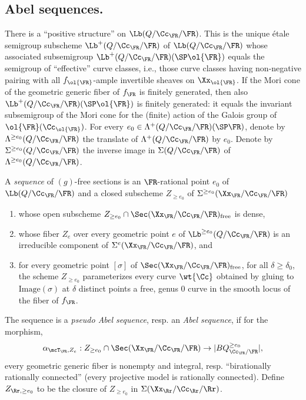 \subsection{Abel sequences.} \label{subsec-Abelseq}
There is a ``positive structure'' on $\Lb(Q/\Cc_\FR/\FR)$. This is the unique étale semigroup subscheme $\Lb^+(Q/\Cc_\FR/\FR)$ of $\Lb(Q/\Cc_\FR/\FR)$ whose associated subsemigroup $\Lb^+(Q/\Cc_\FR/\FR)(\SP \ol{\FR})$ equals the semigroup of ``effective'' curve classes, i.e., those curve classes having non-negative pairing with all $f_{\ol{\FR}}$-ample invertible sheaves on $\Xx_{\ol{\FR}}$. If the Mori cone of the geometric generic fiber of $f_\FR$ is finitely generated, then also $\Lb^+(Q/\Cc_\FR/\FR)(\SP \ol{\FR})$ is finitely generated: it equals the invariant subsemigroup of the Mori cone for the (finite) action of the Galois group of $\ol{\FR}(\Cc_{\ol{\FR}})$. For every $e_0\in
\Lambda^+(Q/\Cc_\FR/\FR)(\SP \FR)$, denote by $\Lambda^{\geq e_0}(Q/\Cc_\FR/\FR)$ the translate of $\Lambda^+(Q/\Cc_\FR/\FR)$ by $e_0$. Denote by $\Sigma^{\geq e_0}(Q/\Cc_\FR/\FR)$ the inverse image in $\Sigma(Q/\Cc_\FR/\FR)$ of $\Lambda^{\geq e_0}(Q/\Cc_\FR/\FR)$.


\goodbreak
\begin{defi}\label{defn-seq}
A \emph{sequence} of $(g)$-free sections is an $\FR$-rational point $e_0$ of $\Lb(Q/\Cc_\FR/\FR)$ and a closed subscheme $Z_{\geq e_0}$ of $\Sigma^{\geq e_0}(\Xx_\FR/\Cc_\FR/\FR)$
\begin{enumerate}\romanenumi
\item \label{list2.5.1}whose open subscheme $Z_{\geq e_0}
\cap \Sec(\Xx_\FR/\Cc_\FR/\FR)_{\text{free}}$ is dense,
\item \label{list2.5.2}whose fiber $Z_e$ over every geometric point $e$ of $\Lb^{\geq e_0}(Q/\Cc_\FR/\FR)$ is an irreducible component of $\Sigma^e(\Xx_\FR/\Cc_\FR/\FR)$, and
\item \label{list2.5.3}for every geometric point $[\sigma]$ of $\Sec(\Xx_\FR/\Cc_\FR/\FR)_{\text{free}}$, for all $\delta \geq \delta_0$, the scheme $Z_{\geq e_0}$ parameterizes every curve $\wt{\Cc}$ obtained by gluing to $\text{Image}(\sigma)$ at $\delta$ distinct points a free, genus $0$ curve in the smooth locus of the fiber of $f_\FR$.
\end{enumerate}
The sequence is a \emph{pseudo Abel sequence}, resp. an \emph{Abel sequence}, if for the morphism,
\[
\alpha_{\mcT_\FR,Z_e}: Z_{\geq e_0}\cap\Sec(\Xx_\FR/\Cc_\FR/\FR) \to |BQ^{\geq e_0}_{\Cc_\FR/\FR}|,
\]
every geometric generic fiber is nonempty and integral, resp. ``birationally rationally connected'' (every projective model is rationally connected). Define $Z_{\Rr,\geq e_0}$ to be the closure of $Z_{\geq e_0}$ in $\Sigma(\Xx_\Rr/\Cc_\Rr/\Rr)$.
\end{defi}

